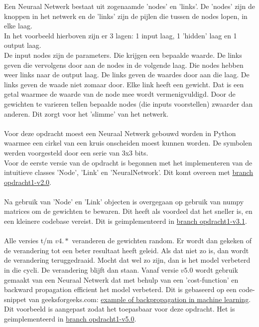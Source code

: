 \documentclass{article} %
\begin{document}
            Een Neuraal Netwerk bestaat uit zogenaamde 'nodes' en 'links'. De 'nodes' zijn de knoppen in het netwerk en de 'links' zijn de pijlen die tussen de nodes lopen, in elke laag. \\
            In het voorbeeld hierboven zijn er 3 lagen: 1 input laag, 1 'hidden' laag en 1 output laag. \\
            De input nodes zijn de parameters. Die krijgen een bepaalde waarde. De links geven die vervolgens door aan de nodes in de volgende laag. Die nodes hebben weer links naar de output laag. De links geven de waardes door aan die laag. De links geven de waade niet zomaar door. Elke link heeft een gewicht. Dat is een getal waarmee de waarde van de node mee wordt vermenigvuldigd. Door de gewichten te varieren tellen bepaalde nodes (die inputs voorstellen) zwaarder dan anderen. Dit zorgt voor het 'slimme' van het netwerk. \\ \\
            Voor deze opdracht moest een Neuraal Netwerk gebouwd worden in Python waarmee een cirkel van een kruis onscheiden moest kunnen worden. De symbolen werden voorgesteld door een serie van 3x3 bits. \\
            Voor de eerste versie van de opdracht is begonnen met het implementeren van de intuitieve classes 'Node', 'Link' en 'NeuralNetwork'. Dit komt overeen met \href{https://github.com/tdregmans/TINLML02-persoonlijk-verslag/tree/opdracht1-v2.0/opdracht1}{branch opdracht1-v2.0}. \\ \\
            Na gebruik van 'Node' en 'Link' objecten is overgegaan op gebruik van numpy matrices om de gewichten te bewaren. Dit heeft als voordeel dat het sneller is, en een kleinere codebase vereist. Dit is geimplementeerd in \href{https://github.com/tdregmans/TINLML02-persoonlijk-verslag/tree/opdracht1-v3.1/opdracht1}{branch opdracht1-v3.1}. \\ \\
            Alle versies t/m \(v4.*\) veranderen de gewichten random. Er wordt dan gekeken of de verandering tot een beter resultaat heeft geleid. Als dat niet zo is, dan wordt de verandering teruggedraaid. Mocht dat wel zo zijn, dan is het model verbeterd in die cycli. De verandering blijft dan staan. Vanaf versie \(v5.0\) wordt gebruik gemaakt van een Neuraal Netwerk dat met behulp van een 'cost-function' en backward propagation efficient het model verbeterd. Dit is gebaseerd op een code-snippet van geeksforgeeks.com: \href{https://www.geeksforgeeks.org/backpropagation-in-machine-learning/#example-of-backpropagation-in-machine-learning}{example of backpropagation in machine learning}. Dit voorbeeld is aangepast zodat het toepasbaar voor deze opdracht. Het is geimplementeerd in \href{https://github.com/tdregmans/TINLML02-persoonlijk-verslag/tree/opdracht1-v5.0/opdracht1}{branch opdracht1-v5.0}.
    
\end{document}
